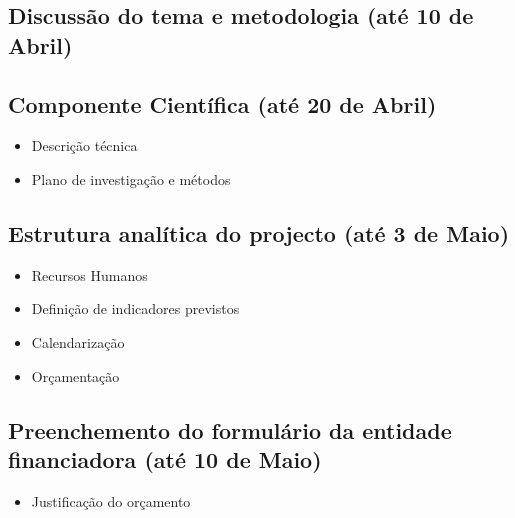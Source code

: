 \documentclass[%
	nofootinbib,
	amsmath,amssymb,
	aps,
	12pt,
	a4paper
]{article}
\begin{document}
\subsection{Discussão do tema e metodologia (até 10 de Abril)}

\subsection{Componente Científica (até 20 de Abril)}
\begin{itemize}
	\item Descrição técnica
	\item Plano de investigação e métodos
\end{itemize}

\subsection{Estrutura analítica do projecto (até 3 de Maio)}
\begin{itemize}
	\item Recursos Humanos
	\item Definição de indicadores previstos
	\item Calendarização
	\item Orçamentação
\end{itemize}
\subsection{Preenchemento do formulário da entidade financiadora (até 10 de Maio)}
\begin{itemize}
	\item Justificação do orçamento
\end{itemize}





\nocite{*}
{}
\end{document}
